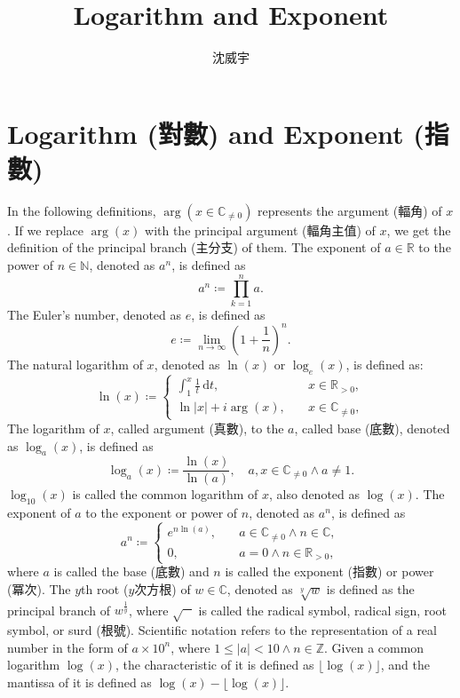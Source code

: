 \documentclass[a4paper,12pt]{article}
\begin{document}
\title{Logarithm and Exponent}
\author{沈威宇}
\date{\temtoday}
\titletocdoc
\section{Logarithm (對數) and Exponent (指數)}
In the following definitions, $\arg(x\in\mathbb{C}_{\neq 0})$ represents the argument (輻角) of $x$. If we replace $\arg(x)$ with the principal argument (輻角主值) of $x$, we get the definition of the principal branch (主分支) of them.
The exponent of $a\in\mathbb{R}$ to the power of $n\in\mathbb{N}$, denoted as $a^n$, is defined as
\[a^n\coloneq\prod_{k=1}^na.\]
The Euler's number, denoted as $e$, is defined as
\[e\coloneq\lim_{n\to\infty}\left(1+\frac{1}{n}\right)^n.\]
The natural logarithm of $x$, denoted as $\ln(x)$ or $\log_e(x)$, is defined as:
\[\ln(x)\coloneq\begin{cases}
\int_1^x\frac{1}{t}\,\mathrm{d}t,\quad & x\in\mathbb{R}_{>0},\\
\ln|x|+i\arg(x),\quad & x\in\mathbb{C}_{\neq 0},
\end{cases}\]
The logarithm of $x$, called argument (真數), to the $a$, called base (底數), denoted as $\log_a(x)$, is defined as
\[\log_a(x)\coloneq\frac{\ln(x)}{\ln(a)},\quad a,x\in\mathbb{C}_{\neq 0}\land a\neq 1.\]
$\log_{10}(x)$ is called the common logarithm of $x$, also denoted as $\log(x)$.
The exponent of $a$ to the exponent or power of $n$, denoted as $a^n$, is defined as
\[a^n\coloneq\begin{cases}
e^{n\ln(a)},\quad & a\in\mathbb{C}_{\neq 0}\land n\in\mathbb{C},\\
0,\quad & a=0\land n\in\mathbb{R}_{>0},
\end{cases}\]
where $a$ is called the base (底數) and $n$ is called the exponent (指數) or power (冪次).
The $y$th root ($y$次方根) of $w\in\mathbb{C}$, denoted as $\sqrt[y]{w}$ is defined as the principal branch of $w^{\frac{1}{y}}$, where $\sqrt{\phantom{w}}$ is called the radical symbol, radical sign, root symbol, or surd (根號).
Scientific notation refers to the representation of a real number in the form of $a\times 10^n$, where $1\leq |a|<10\land n\in\mathbb{Z}$.
Given a common logarithm $\log(x)$, the characteristic of it is defined as $\lfloor\log(x)\rfloor$, and the mantissa of it is defined as $\log(x)-\lfloor\log(x)\rfloor$.
\end{document}
